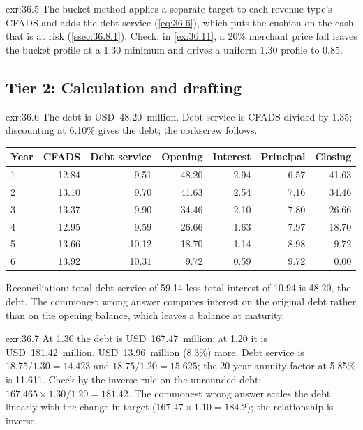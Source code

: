 \begin{solution}{exr:36.5}
The bucket method applies a separate target to each revenue type's CFADS and adds the debt service (\cref{eq:36.6}), which puts the cushion on the cash that is at risk (\cref{ssec:36.8.1}). Check: in \cref{ex:36.11}, a 20\% merchant price fall leaves the bucket profile at a 1.30\x{} minimum and drives a uniform 1.30\x{} profile to 0.85\x.
\end{solution}

\subsection*{Tier 2: Calculation and drafting}

\begin{solution}{exr:36.6}
The debt is USD~48.20~million. Debt service is CFADS divided by 1.35; discounting at 6.10\% gives the debt; the corkscrew follows.
\begin{center}\small
\begin{tabularx}{\linewidth}{@{}L rrrrrr@{}}
\toprule
Year & CFADS & Debt service & Opening & Interest & Principal & Closing\\
 & 12.84 & 9.51 & 48.20 & 2.94 & 6.57 & 41.63\\
2 & 13.10 & 9.70 & 41.63 & 2.54 & 7.16 & 34.46\\
3 & 13.37 & 9.90 & 34.46 & 2.10 & 7.80 & 26.66\\
4 & 12.95 & 9.59 & 26.66 & 1.63 & 7.97 & 18.70\\
5 & 13.66 & 10.12 & 18.70 & 1.14 & 8.98 & 9.72\\
6 & 13.92 & 10.31 & 9.72 & 0.59 & 9.72 & 0.00\\
\bottomrule
\end{tabularx}
\end{center}
Reconciliation: total debt service of 59.14 less total interest of 10.94 is 48.20, the debt. The commonest wrong answer computes interest on the original debt rather than on the opening balance, which leaves a balance at maturity.
\end{solution}

\begin{solution}{exr:36.7}
At 1.30\x{} the debt is USD~167.47~million; at 1.20\x{} it is USD~181.42~million, USD~13.96~million (8.3\%) more. Debt service is $18.75/1.30 = 14.423$ and $18.75/1.20 = 15.625$; the 20-year annuity factor at 5.85\% is 11.611. Check by the inverse rule on the unrounded debt: $167.465 \times 1.30/1.20 = 181.42$. The commonest wrong answer scales the debt linearly with the change in target ($167.47 \times 1.10 = 184.2$); the relationship is inverse.
\end{solution}

